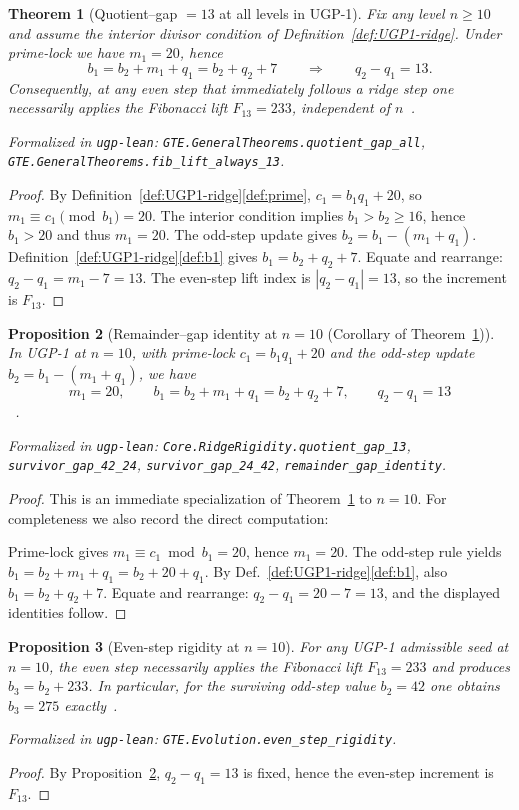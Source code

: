 \documentclass[12pt]{article}
\newtheorem{theorem}{Theorem}[section]
\newtheorem{proposition}[theorem]{Proposition}
\numberwithin{equation}{section}
\begin{document}
\begin{theorem}[Quotient--gap \(=13\) at all levels in UGP-1]\label{thm:gap13-all}
Fix any level \(n\ge 10\) and assume the interior divisor condition of Definition~\ref{def:UGP1-ridge}. Under prime-lock we have \(m_1=20\), hence
\[
b_1=b_2+m_1+q_1=b_2+q_2+7\qquad\Longrightarrow\qquad q_2-q_1=13.
\]
Consequently, at any even step that immediately follows a ridge step one necessarily applies the Fibonacci lift \(F_{13}=233\), independent of \(n\)~\cite{SpivackUGPFormalization,ugp-lean}.

\noindent\emph{Formalized in} \texttt{ugp-lean}: \texttt{GTE.GeneralTheorems.quotient\_gap\_all}, \texttt{GTE.GeneralTheorems.fib\_lift\_always\_13}.
\end{theorem}
\begin{proof}
By Definition~\ref{def:UGP1-ridge}\ref{def:prime}, \(c_1=b_1 q_1+20\), so \(m_1\equiv c_1\pmod{b_1}=20\). The interior condition implies \(b_1>b_2\ge 16\), hence \(b_1>20\) and thus \(m_1=20\). The odd-step update gives \(b_2=b_1-(m_1+q_1)\). Definition~\ref{def:UGP1-ridge}\ref{def:b1} gives \(b_1=b_2+q_2+7\). Equate and rearrange: \(q_2-q_1=m_1-7=13\). The even-step lift index is \(|q_2-q_1|=13\), so the increment is \(F_{13}\).
\end{proof}

\begin{proposition}[Remainder--gap identity at $n=10$ (Corollary of Theorem~\ref{thm:gap13-all})]\label{prop:rema-gap}
In UGP-1 at $n=10$, with prime-lock $c_1=b_1 q_1+20$ and the odd-step update $b_2=b_1-(m_1+q_1)$, we have
\[
m_1=20,\qquad b_1=b_2+m_1+q_1=b_2+q_2+7,\qquad q_2-q_1=13
\]
~\cite{SpivackUGPFormalization,ugp-lean}.

\noindent\emph{Formalized in} \texttt{ugp-lean}: \texttt{Core.RidgeRigidity.quotient\_gap\_13}, \texttt{survivor\_gap\_42\_24}, \texttt{survivor\_gap\_24\_42}, \texttt{remainder\_gap\_identity}.
\end{proposition}
\begin{proof}
This is an immediate specialization of Theorem~\ref{thm:gap13-all} to $n=10$. For completeness we also record the direct computation:

Prime-lock gives $m_1\equiv c_1\bmod b_1=20$, hence $m_1=20$. The odd-step rule yields $b_1=b_2+m_1+q_1=b_2+20+q_1$. By Def.~\ref{def:UGP1-ridge}\ref{def:b1}, also $b_1=b_2+q_2+7$. Equate and rearrange: $q_2-q_1=20-7=13$, and the displayed identities follow.
\end{proof}
\begin{proposition}[Even-step rigidity at $n=10$]
For any UGP-1 admissible seed at $n=10$, the even step necessarily applies the Fibonacci lift $F_{13}=233$ and produces $b_3=b_2+233$. In particular, for the surviving odd-step value $b_2=42$ one obtains $b_3=275$ exactly~\cite{SpivackUGPFormalization,ugp-lean}.

\noindent\emph{Formalized in} \texttt{ugp-lean}: \texttt{GTE.Evolution.even\_step\_rigidity}.
\end{proposition}
\begin{proof}
By Proposition~\ref{prop:rema-gap}, $q_2-q_1=13$ is fixed, hence the even-step increment is $F_{13}$.
\end{proof}
\end{document}
